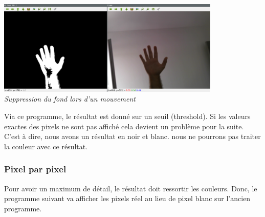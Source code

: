 \documentclass[12pt, french]{report}
\begin{document}
    \begin{center}
        \includegraphics[width=0.8\textwidth]{Images/BGSub/BGSub1.png}\\
        \textit{Suppression du fond lors d'un mouvement}\\
    \end{center}    
    
    Via ce programme, le résultat est donné sur un seuil (threshold). Si les valeurs exactes des pixels ne sont pas affiché cela devient un problème pour la suite. C'est à dire, nous avons un résultat en noir et blanc. nous ne pourrons pas traiter la couleur avec ce résultat.
    
    \subsubsection{Pixel par pixel}
    Pour avoir un maximum de détail, le résultat doit ressortir les couleurs. Donc, le programme suivant va afficher les pixels réel au lieu de pixel blanc sur l'ancien programme.
    
\end{document}

